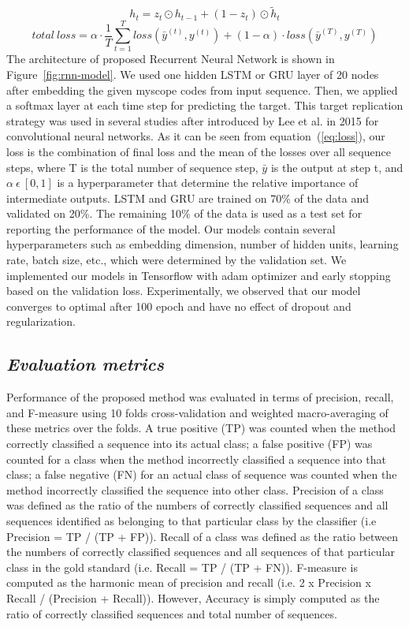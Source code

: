 \documentclass{amia_summit_2018}
\begin{document}
\begin{equation}
h_t = z_t \odot h_{t-1} + (1-z_t) \odot \tilde h_t
\label{eq:lastgru}
\end{equation}  
\begin{equation}
total\ loss = \alpha \cdot \frac{1}{T}\sum_{t=1}^T loss(\bar y^{(t)},y^{(t)}) + (1 - \alpha) \cdot loss(\bar y^{(T)},y^{(T)})
\label{eq:loss}
\end{equation}  
The architecture of proposed Recurrent Neural Network is shown in Figure~\ref{fig:rnn-model}. We used one hidden LSTM or GRU layer of 20 nodes after embedding the given myscope codes from input sequence. Then, we applied a softmax layer at each time step for predicting the target. This target replication strategy was used in several studies \cite{lipton2015learning,choi2016doctor} after introduced by Lee et al.\cite{lee2015deeply} in 2015 for convolutional neural networks. As it can be seen from equation~(\ref{eq:loss}), our loss is the combination of final loss and the mean of the losses over all sequence steps, where T is the total number of sequence step, $\bar y$ is the output at step t, and $\alpha\ \epsilon\ [0, 1]$ is a hyperparameter that determine the relative importance of intermediate outputs. LSTM and GRU are trained on 70\% of the data and validated on 20\%. The remaining 10\% of the data is used as a test set for reporting the performance of the model. Our models contain several hyperparameters such as embedding dimension, number of hidden units, learning rate, batch size, etc., which were determined by the validation set. We implemented our models in Tensorflow with adam optimizer and early stopping based on the validation loss. Experimentally, we observed that our model converges to optimal after 100 epoch and have no effect of dropout and regularization.  
  
\subsection*{\textit{Evaluation metrics}}
Performance of the proposed method was evaluated in terms of precision, recall, and F-measure using 10 folds cross-validation and weighted macro-averaging of these metrics over the folds. A true positive (TP) was counted when the method correctly classified a sequence into its actual class; a false positive (FP) was counted for a class when the method incorrectly classified a sequence into that class; a false negative (FN) for an actual class of sequence was counted when the method incorrectly classified the sequence into other class. Precision of a class was defined as the ratio of the numbers of correctly classified sequences and all sequences identified as belonging to that particular class by the classifier (i.e Precision = TP / (TP + FP)). Recall of a class was defined as the ratio between the numbers of correctly classified sequences and all sequences of that particular class in the gold standard (i.e. Recall = TP / (TP + FN)). F-measure is computed as the harmonic mean of precision and recall (i.e. 2 x Precision x Recall / (Precision + Recall)). However, Accuracy is simply computed as the ratio of correctly classified sequences and total number of sequences.   
\end{document}
